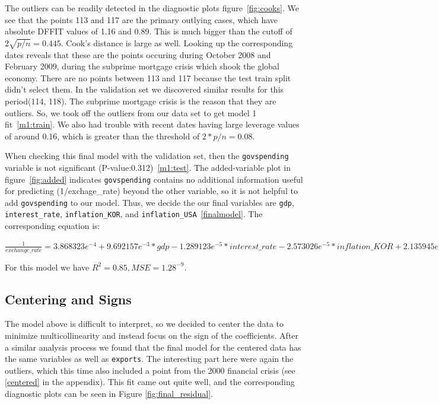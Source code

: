 \documentclass[12pt]{article}
\begin{document}
The outliers can be readily detected in the diagnostic plots 
figure~\ref{fig:cooks}. We see
that the points 113 and 117 are the primary outlying cases, which have
absolute DFFIT values of 1.16 and 0.89. This is much bigger than the cutoff
of $2 \sqrt{p / n} = 0.445$. Cook's distance is large as well.
Looking up the
corresponding dates reveals that these are the points occuring during
October 2008 and February 2009, during the subprime mortgage crisis
which shook the global economy. There are no points between 113 and 117
because the test train split didn't select them. In the validation set we
discovered similar results for this period(114, 118). The subprime mortgage
crisis is the reason that they are outliers. So, we took off the outliers
from our data set to get model 1 fit~\ref{m1:train}. We also had trouble
with recent dates having large leverage values of around 0.16, which is
greater than the threshold of $2 * p / n = 0.08$.

When checking this final model with the validation set, then the
\texttt{govspending} variable is not
significant (P-value:0.312)~\ref{m1:test}. The added-variable plot in
figure~\ref{fig:added} indicates \texttt{govspending} contains no
additional information useful for predicting (1/exchage\_rate) beyond the
other variable, so it is not helpful to add \texttt{govspending} to our
model. Thus, we decide the our final variables are \texttt{gdp},
\texttt{interest\_rate}, \texttt{inflation\_KOR}, and
\texttt{inflation\_USA}~\ref{finalmodel}. The corresponding equation is:

$\frac{1}{exchange\_rate} = 3.868323e^{-4} + 9.692157e^{-3} * gdp
-1.289123e^{-5} *interest\_rate -2.573026e^{-5} * inflation\_KOR +
2.135945e^{-5}  * inflation\_USA$ 

For this model we have $R^2 = 0.85, MSE = 1.28^{-9}$.

\subsection{Centering and Signs}

The model above is difficult to interpret, so we decided to center the data
to minimize multicollinearity and instead focus on the sign of the
coefficients. After a
similar analysis process we found that the final model
for the centered data has the same variables as well as \texttt{exports}.
The interesting part here were again the outliers, which this time also included
a point from the 2000 financial crisis (see \ref{centered} in the appendix). This fit came out
quite well, and the corresponding diagnostic plots can be seen in 
Figure \ref{fig:final_residual}.
\end{document}
